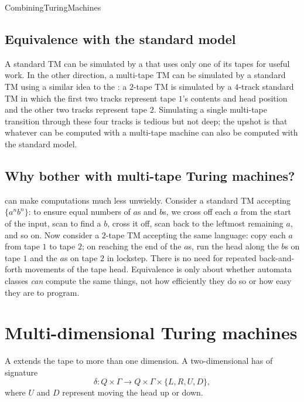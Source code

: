 \documentclass[hidelinks]{article}
\begin{document}
\begin{smodule}[title={Further Turing Machine Models, and Combining Turing Machines}]{CombiningTuringMachines}
\subsection{Equivalence with the standard model}

A standard TM can be simulated by a  that uses only one of its tapes for useful work. In the other direction, a multi-tape TM can be simulated by a standard TM using a similar idea to the : a $2$-tape TM is simulated by a $4$-track standard TM in which the first two tracks represent tape $1$'s contents and head position and the other two tracks represent tape $2$. Simulating a single multi-tape transition through these four tracks is tedious but not deep; the upshot is that whatever can be computed with a multi-tape machine can also be computed with the standard model.

\subsection{Why bother with multi-tape Turing machines?}

 can make computations much less unwieldy. Consider a standard TM accepting $\{a^n b^n\}$: to ensure equal numbers of $a$s and $b$s, we cross off each $a$ from the start of the input, scan to find a $b$, cross it off, scan back to the leftmost remaining $a$, and so on. Now consider a $2$-tape TM accepting the same language: copy each $a$ from tape $1$ to tape $2$; on reaching the end of the $a$s, run the head along the $b$s on tape $1$ and the $a$s on tape $2$ in lockstep. There is no need for repeated back-and-forth movements of the tape head. Equivalence is only about whether automata classes \emph{can} compute the same things, not how efficiently they do so or how easy they are to program.

\section{Multi-dimensional Turing machines}

\begin{sdefinition}[for=multi-dimensional Turing machine]
A  extends the tape to more than one dimension. A two-dimensional  has  of signature
\[
\delta : Q \times \Gamma \to Q \times \Gamma \times \{L, R, U, D\},
\]
where $U$ and $D$ represent moving the head up or down.
\end{sdefinition}


\end{smodule}
\end{document}
